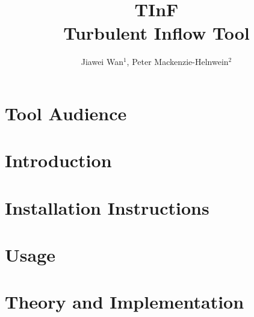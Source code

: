 \documentclass{simcenterdocumentation}
\begin{document}
\title{TInF\\ \Large Turbulent Inflow Tool}
\author{Jiawei Wan$^{1}$, Peter Mackenzie-Helnwein$^2$}

\hypersetup{pageanchor=false}
\maketitle
\copyrightpage
\acknowledgments

\hypersetup{pageanchor=true}
\begin{frontmatter}

\pagestyle{plain}
{
  \renewcommand{\thispagestyle}[1]{}
  \tableofcontents
  \clearpage
  \listoffigures
}

\end{frontmatter}
\pagestyle{somewhatsimple}

\chapter{Tool Audience}


\chapter{Introduction}


\chapter{Installation Instructions}


\chapter{Usage}


\chapter{Theory and Implementation}
  
\end{document}
